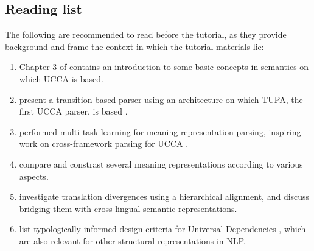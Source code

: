 \documentclass[11pt,table]{article}
\begin{document}
\subsection{Reading list}\label{sec:reading}

The following are recommended to read before the tutorial, as
they provide background and frame the context in which the tutorial
materials lie:

\begin{enumerate}
    \item Chapter 3 of  contains an introduction
    to some basic concepts in semantics on which UCCA is based.
    \item {} present a
    transition-based parser using an architecture on which TUPA, the first
    UCCA parser, is based \cite{hershcovich2017a}.
    \item {} performed multi-task learning for
    meaning representation parsing, inspiring work on cross-framework
    parsing for UCCA \cite{hershcovich2018multitask}.
    \item {} compare and constrast several meaning
    representations according to various aspects.
    \item {} investigate translation divergences
    using a hierarchical alignment,
    and discuss bridging them with cross-lingual semantic representations.
    \item {} list typologically-informed design 
    criteria for Universal Dependencies \cite{nivre-etal-2020-universal},
    which are also relevant for other structural representations in NLP.
\end{enumerate}
\end{document}
